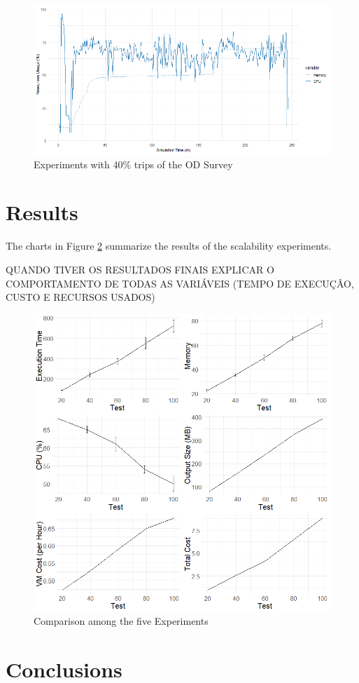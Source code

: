 \begin{figure}[!htb]
\centering
\includegraphics[width=1\textwidth]{figuras/chap-exp/experiment40.png}
\caption{Experiments with 40\% trips of the OD Survey}
\label{fig:exp20}
\end{figure}

\section{Results}
\label{sec:results_exp}

The charts in Figure \ref{fig:exp20} summarize the results of the scalability experiments.

QUANDO TIVER OS RESULTADOS FINAIS EXPLICAR O COMPORTAMENTO DE TODAS AS VARIÁVEIS (TEMPO DE EXECUÇÂO, CUSTO E RECURSOS USADOS)

\begin{figure}[!htb]
\centering
\includegraphics[width=1\textwidth]{figuras/chap-exp/dados.png}
\caption{Comparison among the five Experiments}
\label{fig:exp20}
\end{figure}


\section{Conclusions}
\label{sec:conclusions_exp}